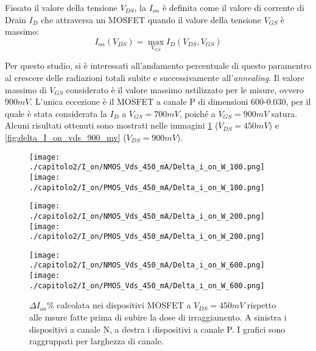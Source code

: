 Fissato il valore della tensione $V_{DS}$, la $I_{on}$ è definita come il valore di corrente di Drain $I_D$ che attraversa un MOSFET quando il valore della tensione $V_{GS}$ è massimo:
$$I_{on}(V_{DS}) = \max_{V_{GS}} I_D(V_{DS},V_{GS})$$

Per questo studio, si è interessati all'andamento percentuale di questo paramentro al crescere delle radiazioni totali subite e successivamente all'\emph{annealing}. Il valore massimo di $V_{GS}$ considerato è il valore massimo ustilizzato per le misure, ovvero $900 mV$. L'unica eccezione è il MOSFET a canale P di dimensioni 600-0.030, per il quale è stata considerata la $I_D$ a $V_{GS} = 700 mV$, poiché a $V_{GS} = 900mV$ satura. Alcuni risultati ottenuti sono mostrati nelle immagini \ref{fig:delta_I_on_vds_450_mv} ($V_{DS} = 450 mV$) e \ref{fig:delta_I_on_vds_900_mv} ($V_{DS} = 900 mV$).

\begin{figure}[t]
    \centering
    \texttt{[image: ./capitolo2/I\_on/NMOS\_Vds\_450\_mA/Delta\_i\_on\_W\_100.png]}
    \texttt{[image: ./capitolo2/I\_on/PMOS\_Vds\_450\_mA/Delta\_i\_on\_W\_100.png]}

    \vspace{0.5cm}
    \texttt{[image: ./capitolo2/I\_on/NMOS\_Vds\_450\_mA/Delta\_i\_on\_W\_200.png]}
    \texttt{[image: ./capitolo2/I\_on/PMOS\_Vds\_450\_mA/Delta\_i\_on\_W\_200.png]}

    \vspace{0.5cm}

    \texttt{[image: ./capitolo2/I\_on/NMOS\_Vds\_450\_mA/Delta\_i\_on\_W\_600.png]}
    \texttt{[image: ./capitolo2/I\_on/PMOS\_Vds\_450\_mA/Delta\_i\_on\_W\_600.png]}

    \caption[Dati $\Delta I_{on}\%$ a $V_{DS}=440mV$ ]{$\Delta I_{on}\%$ calcolata nei dispositivi MOSFET a $V_{DS} = 450mV$ rispetto alle msure fatte prima di subire la dose di irraggiamento. A sinistra i dispositivi a canale N, a destra i dispositivi a canale P. I grafici sono raggruppati per larghezza di canale.}
    \label{fig:delta_I_on_vds_450_mv}

\end{figure}

